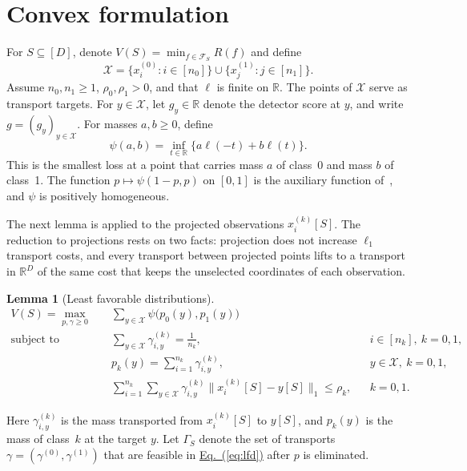 \documentclass[11pt,a4paper]{article}
\newcommand{\Eqref}[1]{\hyperref[#1]{Eq.~(\ref*{#1})}}
\theoremstyle{plain}
\newtheorem{lemma}[proposition]{Lemma}
\begin{document}
\section{Convex formulation}\label{sec:finite}
For $S\subseteq[D]$, denote $V(S)=\min_{f\in\mathcal F_S}R(f)$ and define
\[
\mathcal X=\{x_i^{(0)}:i\in[n_0]\}\cup
\{x_j^{(1)}:j\in[n_1]\}.
\]
Assume $n_0,n_1\ge1$, $\rho_0,\rho_1>0$, and that $\ell$ is finite
on $\mathbb R$. The points of $\mathcal X$ serve as transport targets.
For $y\in\mathcal X$, let $g_y\in\mathbb R$ denote the detector score
at $y$, and write $g=(g_y)_{y\in\mathcal X}$. For masses $a,b\ge0$,
define
\[
\psi(a,b)=\inf_{t\in\mathbb R}\bigl\{a\ell(-t)+b\ell(t)\bigr\}.
\]
This is the smallest loss at a point that carries mass $a$ of class~0
and mass $b$ of class~1. The function $p\mapsto\psi(1-p,p)$ on $[0,1]$
is the auxiliary function of~\cite{gao2018robust}, and $\psi$ is
positively homogeneous.

The next lemma is \cite[Proposition~1 and Theorem~3]{gao2018robust}
applied to the projected observations $x_i^{(k)}[S]$. The reduction to
projections rests on two facts: projection does not increase $\ell_1$
transport costs, and every transport between projected points lifts to
a transport in $\mathbb R^D$ of the same cost that keeps the unselected
coordinates of each observation.

\begin{lemma}[Least favorable distributions]\label{prop:lfd}
\begin{equation}\label{eq:lfd}
\begin{aligned}
V(S)=\max_{p,\gamma\ge0}\quad&
\sum_{y\in\mathcal X}\psi\bigl(p_0(y),p_1(y)\bigr)\\
\text{subject to}\quad&
\sum_{y\in\mathcal X}\gamma_{i,y}^{(k)}=\frac1{n_k},
&&i\in[n_k],\ k=0,1,\\
&p_k(y)=\sum_{i=1}^{n_k}\gamma_{i,y}^{(k)},
&&y\in\mathcal X,\ k=0,1,\\
&\sum_{i=1}^{n_k}\sum_{y\in\mathcal X}
\gamma_{i,y}^{(k)}\|x_i^{(k)}[S]-y[S]\|_1\le\rho_k,
&&k=0,1.
\end{aligned}
\end{equation}
\end{lemma}
Here $\gamma_{i,y}^{(k)}$ is the mass transported from
$x_i^{(k)}[S]$ to $y[S]$, and $p_k(y)$ is the mass of class~$k$ at the
target $y$. Let $\Gamma_S$ denote the set of transports
$\gamma=(\gamma^{(0)},\gamma^{(1)})$ that are feasible in
\Eqref{eq:lfd} after $p$ is eliminated.
\end{document}
